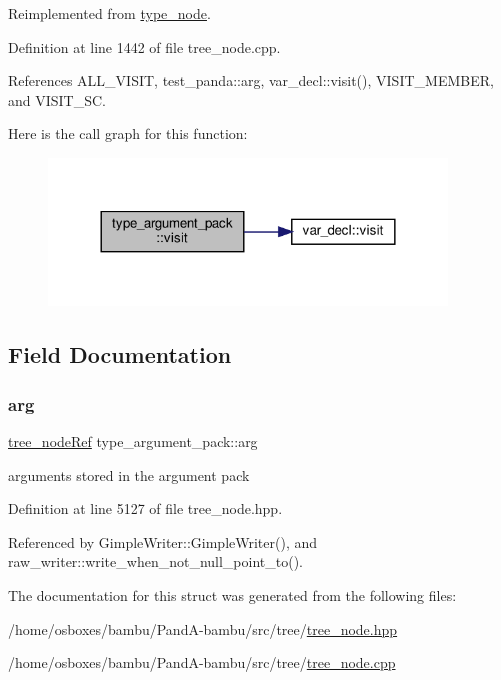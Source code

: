 Reimplemented from \hyperlink{structtype__node_adc6e447af5f9505e6305320933c46a96}{type\+\_\+node}.



Definition at line 1442 of file tree\+\_\+node.\+cpp.



References A\+L\+L\+\_\+\+V\+I\+S\+IT, test\+\_\+panda\+::arg, var\+\_\+decl\+::visit(), V\+I\+S\+I\+T\+\_\+\+M\+E\+M\+B\+ER, and V\+I\+S\+I\+T\+\_\+\+SC.

Here is the call graph for this function\+:
\nopagebreak
\begin{figure}[H]
\begin{center}
\leavevmode
\includegraphics[width=300pt]{dd/da8/structtype__argument__pack_a1367b4b509c18a5ba865cccc463d6172_cgraph}
\end{center}
\end{figure}


\subsection{Field Documentation}
\mbox{\label{structtype__argument__pack_af69775a9c65c2da8ce199e7d891277b5}} 
\subsubsection{\texorpdfstring{arg}{arg}}
{\footnotesize\ttfamily \hyperlink{tree__node_8hpp_a6ee377554d1c4871ad66a337eaa67fd5}{tree\+\_\+node\+Ref} type\+\_\+argument\+\_\+pack\+::arg}



arguments stored in the argument pack 



Definition at line 5127 of file tree\+\_\+node.\+hpp.



Referenced by Gimple\+Writer\+::\+Gimple\+Writer(), and raw\+\_\+writer\+::write\+\_\+when\+\_\+not\+\_\+null\+\_\+point\+\_\+to().



The documentation for this struct was generated from the following files\+:\begin{DoxyCompactItemize}
\item 
/home/osboxes/bambu/\+Pand\+A-\/bambu/src/tree/\hyperlink{tree__node_8hpp}{tree\+\_\+node.\+hpp}\item 
/home/osboxes/bambu/\+Pand\+A-\/bambu/src/tree/\hyperlink{tree__node_8cpp}{tree\+\_\+node.\+cpp}\end{DoxyCompactItemize}
